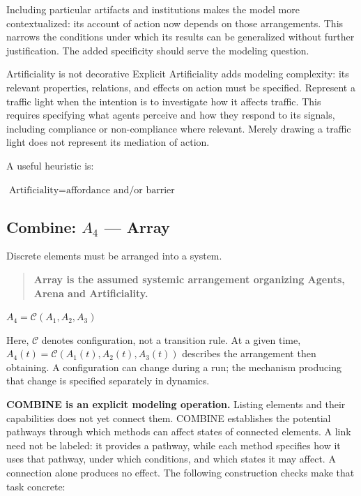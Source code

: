 \documentclass[11pt,a4paper]{article}
\newenvironment{fitdisplay}{\par\medskip\noindent\begin{lrbox}{\displaybox}$\displaystyle}{%
$\end{lrbox}\makebox[\linewidth][c]{\ifdim\wd\displaybox>\linewidth\resizebox{\linewidth}{!}{\usebox{\displaybox}}\else\usebox{\displaybox}\fi}\par\medskip}
\begin{document}
Including particular artifacts and institutions makes the model more contextualized: its account of action now depends on those arrangements. This narrows the conditions under which its results can be generalized without further justification. The added specificity should serve the modeling question.

\begin{principle}{Artificiality is not decorative}
Explicit Artificiality adds modeling complexity: its relevant properties, relations, and effects on action must be specified. Represent a traffic light when the intention is to investigate how it affects traffic. This requires specifying what agents perceive and how they respond to its signals, including compliance or non-compliance where relevant. Merely drawing a traffic light does not represent its mediation of action.
\end{principle}

%

A useful heuristic is:
\begin{fitdisplay}
\boxed{\text{Artificiality}=\text{affordance and/or barrier}}
\end{fitdisplay}

\subsection{Combine: \texorpdfstring{\(A_4\)}{A4} --- Array}

Discrete elements must be arranged into a system.

\begin{quote}
\textbf{Array is the assumed systemic arrangement organizing Agents, Arena and Artificiality.}
\end{quote}

\begin{fitdisplay}
\boxed{
A_4=\mathcal C(A_1,A_2,A_3)
}
\end{fitdisplay}

Here, $\mathcal C$ denotes configuration, not a transition rule. At a given time, $A_4(t)=\mathcal C(A_1(t),A_2(t),A_3(t))$ describes the arrangement then obtaining. A configuration can change during a run; the mechanism producing that change is specified separately in dynamics.

\textbf{COMBINE is an explicit modeling operation.} Listing elements and their capabilities does not yet connect them. COMBINE establishes the potential pathways through which methods can affect states of connected elements. A link need not be labeled: it provides a pathway, while each method specifies how it uses that pathway, under which conditions, and which states it may affect. A connection alone produces no effect. The following construction checks make that task concrete:
\end{document}
